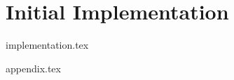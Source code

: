 \documentclass[a4paper, 12pt, oneside]{book}
\begin{document}
\chapter{Initial Implementation}
{implementation.tex}




\backmatter

\setcounter{page}{1} %



\setlength{} %
\printbibliography[heading=bibintoc, title = {References}]



\appendix
\renewcommand{\thechapter}{\alph{chapter}}
{appendix.tex}
\end{document}
